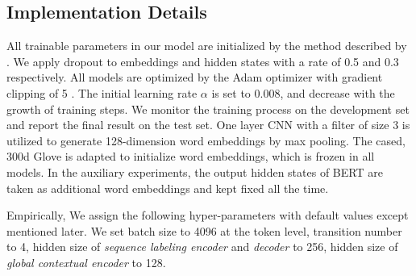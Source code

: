 \documentclass[11pt,a4paper]{article}
\begin{document}
\subsection{Implementation Details}
All trainable parameters in our model are initialized by the method described by \citeauthor{Xavier} . We apply dropout \cite{dropout} to embeddings and hidden states with a rate of 0.5 and 0.3 respectively. All models are optimized by the Adam optimizer \cite{Adam} with gradient clipping of 5 \cite{gradient_clip}. 
The initial learning rate $\alpha$ is set to 0.008, and decrease with the growth of training steps. We monitor the training process on the development set and report the final result on the test set. 
One layer CNN with a filter of size 3 is utilized to generate 128-dimension word embeddings by max pooling. The cased, 300d Glove is adapted to initialize word embeddings, which is frozen in all models. In the auxiliary experiments, the output hidden states of BERT are taken as additional word embeddings and kept fixed all the time.

Empirically, We assign the following hyper-parameters with default values except 
mentioned later.
We set batch size to 4096 at the token level, transition number to 4, hidden size of \emph{sequence labeling encoder} and \emph{decoder} to 256, hidden size of \emph{global contextual encoder} to 128. 
\end{document}
